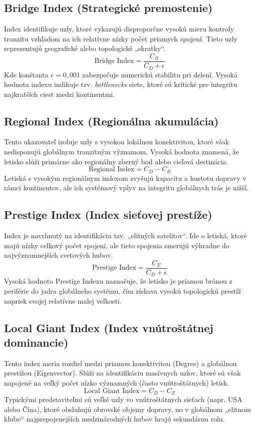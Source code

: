 \subsection{Bridge Index (Strategické premostenie)}
Index identifikuje uzly, ktoré vykazujú disproporčne vysokú mieru kontroly tranzitu vzhľadom na ich relatívne nízky počet priamych spojení. 
Tieto uzly reprezentujú geografické alebo topologické „skratky“.
\[
\text{Bridge Index} = \frac{C_B}{C_D + \epsilon}
\]
Kde konštanta $\epsilon = 0,001$ zabezpečuje numerickú stabilitu pri delení. Vysoká hodnota indexu indikuje tzv. \textit{bottlenecks} 
siete, ktoré sú kritické pre integritu najkratších ciest medzi kontinentmi.

\subsection{Regional Index (Regionálna akumulácia)}
Tento ukazovateľ izoluje uzly s vysokou lokálnou konektivitou, ktoré však nedisponujú globálnym tranzitným významom. Vysoká hodnota znamená, 
že letisko slúži primárne ako regionálny zberný bod alebo cieľová destinácia.
\[
\text{Regional Index} = C_D - C_B
\]
Letiská s vysokým regionálnym indexom zvyšujú kapacitu a hustotu dopravy v rámci kontinentov, ale ich systémový vplyv na integritu globálnych 
trás je nižší.

\subsection{Prestige Index (Index sieťovej prestíže)}
Index je navrhnutý na identifikáciu tzv. „elitných satelitov“. Ide o letiská, ktoré majú nízky celkový počet spojení, ale tieto spojenia smerujú 
výhradne do najvýznamnejších svetových hubov.
\[
\text{Prestige Index} = \frac{C_E}{C_D + \epsilon}
\]
Vysoká hodnota Prestige Indexu naznačuje, že letisko je priamou bránou z periférie do jadra globálneho systému, čím získava vysokú topologickú 
prestíž napriek svojej relatívne malej veľkosti.

\subsection{Local Giant Index (Index vnútroštátnej dominancie)}
Tento index meria rozdiel medzi priamou konektivitou (Degree) a globálnou prestížou (Eigenvector). Slúži na identifikáciu masívnych uzlov, 
ktoré sú však napojené na veľký počet nízko významných (často vnútroštátnych) letísk.
\[
\text{Local Giant Index} = C_D - C_E
\]
Typickými predstaviteľmi sú veľké uzly vo vnútroštátnych sieťach (napr. USA alebo Čína), ktoré obsluhujú obrovské objemy dopravy, no v globálnom 
„elitnom klube“ najprepojenejších medzinárodných hubov hrajú sekundárnu rolu.



